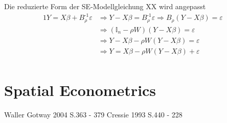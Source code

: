 Die reduzierte Form der SE-Modellgleichung XX wird angepasst
\begin{alignat*}{1}
    Y=X \beta + B_{\rho}^{\text{-1}} \varepsilon & \Rightarrow Y - X \beta = B_{\rho}^{\text{-1}} \varepsilon 
    \Rightarrow B_{\rho} (Y-X \beta) = \varepsilon \\
    & \Rightarrow  (\mathds{I}_{n} - \rho W)(Y-X \beta) = \varepsilon \\
    & \Rightarrow  Y - X \beta - \rho W (Y-X \beta) = \varepsilon \\
    & \Rightarrow  Y = X \beta - \rho W (Y-X \beta) + \varepsilon \\
\end{alignat*}


\section{Spatial Econometrics}

Waller Gotway 2004 S.363  - 379
Cressie 1993 S.440    -  228

